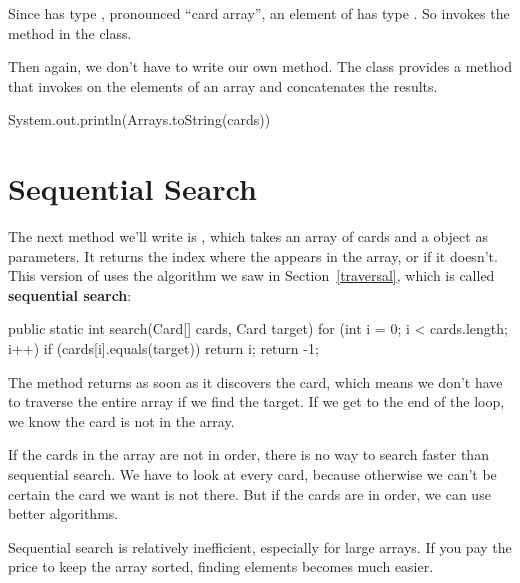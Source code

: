 Since  has type , pronounced ``card array'', an element of  has type .
So  invokes the  method in the  class.

Then again, we don't have to write our own  method.
The  class provides a  method that invokes  on the elements of an array and concatenates the results.

\begin{code}
System.out.println(Arrays.toString(cards))
\end{code}


\section{Sequential Search}


The next method we'll write is , which takes an array of cards and a  object as parameters.
It returns the index where the  appears in the array, or  if it doesn't.
This version of  uses the algorithm we saw in Section~\ref{traversal}, which is called {\bf sequential search}:


\begin{code}
public static int search(Card[] cards, Card target) {
    for (int i = 0; i < cards.length; i++) {
        if (cards[i].equals(target)) {
            return i;
        }
    }
    return -1;
}
\end{code}


The method returns as soon as it discovers the card, which means we don't have to traverse the entire array if we find the target.
If we get to the end of the loop, we know the card is not in the array.


If the cards in the array are not in order, there is no way to search faster than sequential search.
We have to look at every card, because otherwise we can't be certain the card we want is not there.
But if the cards are in order, we can use better algorithms.

Sequential search is relatively inefficient, especially for large arrays.
If you pay the price to keep the array sorted, finding elements becomes much easier.


